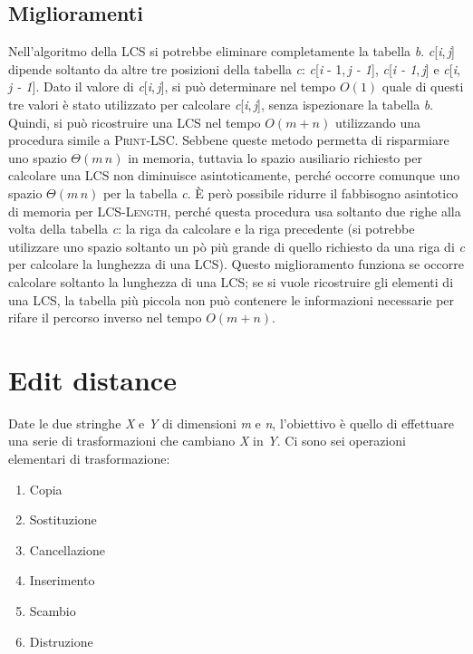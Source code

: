 \documentclass[10pt, a4paper]{report}
\begin{document}
\subsection{Miglioramenti}
Nell'algoritmo della LCS si potrebbe eliminare completamente la tabella \textit{b}. \textit{c}[\textit{i},\,\textit{j}] dipende soltanto da altre tre posizioni della tabella \textit{c}: \textit{c}[\textit{i} - 1,\,\textit{j - 1}], \textit{c}[\textit{i - 1},\,\textit{j}] e \textit{c}[\textit{i},\,\textit{j - 1}]. Dato il valore di \textit{c}[\textit{i},\,\textit{j}], si può determinare nel tempo $O(1)$ quale di questi tre valori è stato utilizzato per calcolare \textit{c}[\textit{i},\,\textit{j}], senza ispezionare la tabella \textit{b}. Quindi, si può ricostruire una LCS nel tempo $O(m + n)$ utilizzando una procedura simile a \textsc{Print-LSC}. Sebbene queste metodo permetta di risparmiare uno spazio $\Theta(m\,n)$ in memoria, tuttavia lo spazio ausiliario richiesto per calcolare una LCS non diminuisce asintoticamente, perché occorre comunque uno spazio $\Theta(m\,n)$ per la tabella \textit{c}. È però possibile ridurre il fabbisogno asintotico di memoria per \textsc{LCS-Length}, perché questa procedura usa soltanto due righe alla volta della tabella \textit{c}: la riga da calcolare e la riga precedente (si potrebbe utilizzare uno spazio soltanto un pò più grande di quello richiesto da una riga di \textit{c} per calcolare la lunghezza di una LCS). Questo miglioramento funziona se occorre calcolare soltanto la lunghezza di una LCS; se si vuole ricostruire gli elementi di una LCS, la tabella più piccola non può contenere le informazioni necessarie per rifare il percorso inverso nel tempo $O(m + n)$.
\section{Edit distance}
Date le due stringhe \textit{X} e \textit{Y} di dimensioni \textit{m} e \textit{n}, l'obiettivo è quello di effettuare una serie di trasformazioni che cambiano \textit{X} in \textit{Y}. Ci sono sei operazioni elementari di trasformazione:
\begin{enumerate}
\item Copia
\item Sostituzione
\item Cancellazione
\item Inserimento
\item Scambio
\item Distruzione
\end{enumerate}
\end{document}
